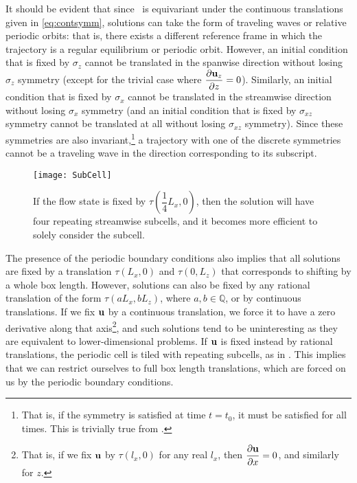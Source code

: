 It should be evident that since \pCf\ is equivariant under the continuous translations given in \eqref{eq:contsymm}, solutions can take the form of traveling waves or relative periodic orbits: that is, there exists a different reference frame in which the trajectory is a regular equilibrium or periodic orbit. However, an initial condition that is fixed by $\sigma_z$ cannot be translated in the spanwise direction without losing $\sigma_z$ symmetry (except for the trivial case where $\pder{1}{\Vector{u}_z}{z} = 0$). Similarly, an initial condition that is fixed by $\sigma_x$ cannot be translated in the streamwise direction without losing $\sigma_x$ symmetry (and an initial condition that is fixed by $\sigma_{xz}$ symmetry cannot be translated at all without losing $\sigma_{xz}$ symmetry). Since these symmetries are also invariant,\footnote{That is, if the symmetry is satisfied at time $t = t_0$, it must be satisfied for all times. This is trivially true from .} a trajectory with one of the discrete symmetries cannot be a traveling wave in the direction corresponding to its subscript. \\
 \begin{figure}[t!]
\texttt{[image: SubCell]}
\caption{If the flow state is fixed by $\tau(\dfrac{1}{4}L_x,0)$, then the solution will have four repeating streamwise subcells, and it becomes more efficient to solely consider the subcell.}\label{fig:rationalTranslation}

\end{figure}
The presence of the periodic boundary conditions also implies that all solutions are fixed by a translation $\tau(L_x,0)$ and $\tau(0,L_z)$ that corresponds to shifting by a whole box length. However, solutions can also be fixed by any rational translation of the form $\tau(a L_x,b L_z)$, where $a,b \in \mathbb{Q}$, or by  continuous translations. If we fix $\mathbf{u}$ by a continuous translation, we force it to have a zero derivative along that axis\footnote{That is, if we fix $\mathbf{u}$ by $\tau(l_x,0)$ for any real $l_x$, then $\pder{1}{\Vector{u}}{x} = 0$, and similarly for $z$.}, and such solutions tend to be uninteresting as they are equivalent to lower-dimensional problems. If $\mathbf{u}$ is fixed instead by rational translations, the periodic cell is tiled with repeating subcells, as in . This implies that we can restrict ourselves to full box length translations, which are forced on us by the periodic boundary conditions.\\

